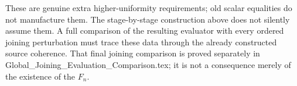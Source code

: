 \documentclass{article}
\begin{document}
These are genuine extra higher-uniformity requirements; old scalar equalities do not manufacture them. The stage-by-stage construction above does not silently assume them. A full comparison of the resulting evaluator with every ordered joining perturbation must trace these data through the already constructed source coherence. That final joining comparison is proved separately in Global\_Joining\_Evaluation\_Comparison.tex; it is not a consequence merely of the existence of the $F_n$.
\end{document}
